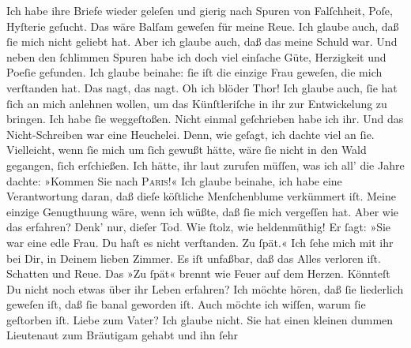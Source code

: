 \begin{ledgroupsized}[t]{13cm}
           \pstart
           Ich habe ihre Briefe wieder geleſen und gierig nach Spuren von Falſchheit, Poſe,
               Hyſterie geſucht. Das wäre Balſam geweſen für meine Reue. Ich glaube auch, daß ſie
               mich nicht geliebt hat. Aber ich glaube auch, daß das meine Schuld war. Und neben den
                  {\pb}ſchlimmen Spuren habe ich doch viel einſache
               Güte, Herzigkeit und Poeſie gefunden. Ich glaube beinahe: ſie iſt die einzige Frau
               geweſen, die mich \strikeout{\textcolor{gray}{ver}} verſtanden hat. Das nagt, das nagt. Oh ich blöder Thor!\pend
           \pstart
           Ich glaube auch, ſie hat ſich an mich anlehnen wollen, um das Künſtleriſche in ihr
               zur Entwickelung zu bringen. Ich habe ſie weggeſtoßen. Nicht einmal geſchrieben habe
               ich ihr. Und das Nicht-Schreiben war eine Heuchelei. Denn, wie geſagt, ich dachte
               viel an ſie. Vielleicht, wenn ſie mich um ſich gewußt hätte, wäre ſie nicht in den
               Wald {\pb}gegangen, ſich erſchießen. Ich hätte, ihr laut
               zurufen müſſen, was ich all’ die Jahre dachte: »Kommen Sie nach \textsc{Paris}!« Ich glaube beinahe, ich habe eine Verantwortung daran, daß dieſe köſtliche
                  Menſchenblume verkümmert
               iſt. Meine einzige Genugthuung wäre, wenn ich wüßte, daß ſie mich vergeſſen hat. Aber
               wie das erfahren?\pend
           \pstart
           Denk’ nur, dieſer Tod\textcolor{gray}{.} Wie ſtolz, wie heldenmüthig! Er ſagt: »Sie
               war eine edle Frau. Du haſt es nicht verſtanden. Zu ſpät.«\pend
           \pstart
           Ich ſehe mich mit ihr bei Dir, in Deinem lieben {\pb}Zimmer. Es iſt unfaßbar, daß das Alles verloren iſt. Schatten und Reue. Das »Zu
               ſpät« brennt wie Feuer auf dem Herzen.\pend
           \pstart
           Könnteſt Du nicht noch etwas über ihr Leben erfahren? Ich möchte hören, daß ſie liederlich geweſen iſt, daß
               ſie banal geworden iſt. Auch möchte ich wiſſen, \strikeout{\textcolor{gray}{×}} warum ſie geſtorben iſt. Liebe zum Vater? Ich glaube nicht. Sie hat einen kleinen dummen Lieutenaut zum Bräutigam gehabt und ihn ſehr

\end{ledgroupsized}
